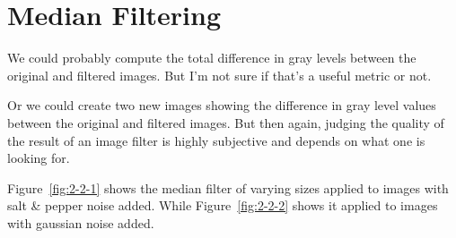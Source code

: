 \section{Median Filtering}
We could probably compute the total difference in gray levels between the original and filtered images.
But I'm not sure if that's a useful metric or not.

Or we could create two new images showing the difference in gray level values between the original and filtered images.
But then again, judging the quality of the result of an image filter is highly subjective and depends on what one is looking for.

Figure~\ref{fig:2-2-1} shows the median filter of varying sizes applied to images with salt \& pepper noise added.
While Figure~\ref{fig:2-2-2} shows it applied to images with gaussian noise added.

